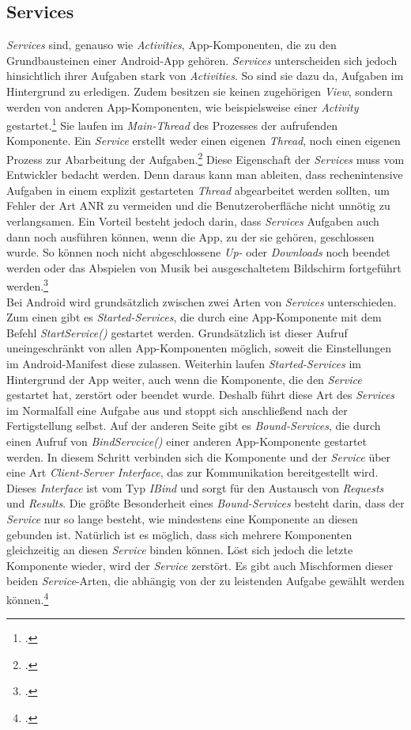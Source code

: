 \subsection{Services}
\label{ssec:android-services}
\textit{Services} sind, genauso wie \textit{Activities}, App-Komponenten, die zu den Grundbausteinen einer Android-App gehören. \textit{Services} unterscheiden sich jedoch hinsichtlich ihrer Aufgaben stark von \textit{Activities}. So sind sie dazu da, Aufgaben im Hintergrund zu erledigen. Zudem besitzen sie keinen zugehörigen \textit{View}, sondern werden von anderen App-Komponenten, wie beispielsweise einer \textit{Activity} gestartet.\footcite[S. 163]{Android-BeckerPant} Sie laufen im \textit{Main-Thread} des Prozesses der aufrufenden Komponente. Ein \textit{Service} erstellt weder einen eigenen \textit{Thread}, noch einen eigenen Prozess zur Abarbeitung der Aufgaben.\footcite{Android-Services} Diese Eigenschaft der \textit{Services} muss vom Entwickler bedacht werden. Denn daraus kann man ableiten, dass rechenintensive Aufgaben in einem explizit gestarteten \textit{Thread} abgearbeitet werden sollten, um Fehler der Art \ac{ANR} zu vermeiden und die Benutzeroberfläche nicht unnötig zu verlangsamen. Ein Vorteil besteht jedoch darin, dass \textit{Services} Aufgaben auch dann noch ausführen können, wenn die App, zu der sie gehören, geschlossen wurde. So können noch nicht abgeschlossene \textit{Up-} oder \textit{Downloads} noch beendet werden oder das Abspielen von Musik bei ausgeschaltetem Bildschirm fortgeführt werden.\footcite[S. 161f.]{Android-BeckerPant}\\
Bei Android wird grundsätzlich zwischen zwei Arten von \textit{Services} unterschieden. Zum einen gibt es \textit{Started-Services}, die durch eine App-Komponente mit dem Befehl \textit{StartService()} gestartet werden. Grundsätzlich ist dieser Aufruf uneingeschränkt von allen App-Komponenten möglich, soweit die Einstellungen im Android-Manifest diese zulassen. Weiterhin laufen \textit{Started-Services} im Hintergrund der App weiter, auch wenn die Komponente, die den \textit{Service} gestartet hat, zerstört oder beendet wurde. Deshalb führt diese Art des \textit{Services} im Normalfall eine Aufgabe aus und stoppt sich anschließend nach der Fertigstellung selbst. Auf der anderen Seite gibt es \textit{Bound-Services}, die durch einen Aufruf von \textit{BindServcice()} einer anderen App-Komponente gestartet werden. In diesem Schritt verbinden sich die Komponente und der \textit{Service} über eine Art \textit{Client-Server Interface}, das zur Kommunikation bereitgestellt wird. Dieses \textit{Interface} ist vom Typ \textit{IBind} und sorgt für den Austausch von \textit{Requests} und \textit{Results}. Die größte Besonderheit eines \textit{Bound-Services} besteht darin, dass der \textit{Service} nur so lange besteht, wie mindestens eine Komponente an diesen gebunden ist. Natürlich ist es möglich, dass sich mehrere Komponenten gleichzeitig an diesen \textit{Service} binden können. Löst sich jedoch die letzte Komponente wieder, wird der \textit{Service} zerstört. Es gibt auch Mischformen dieser beiden \textit{Service}-Arten, die abhängig von der zu leistenden Aufgabe gewählt werden können.\footcite{Android-Services} 

